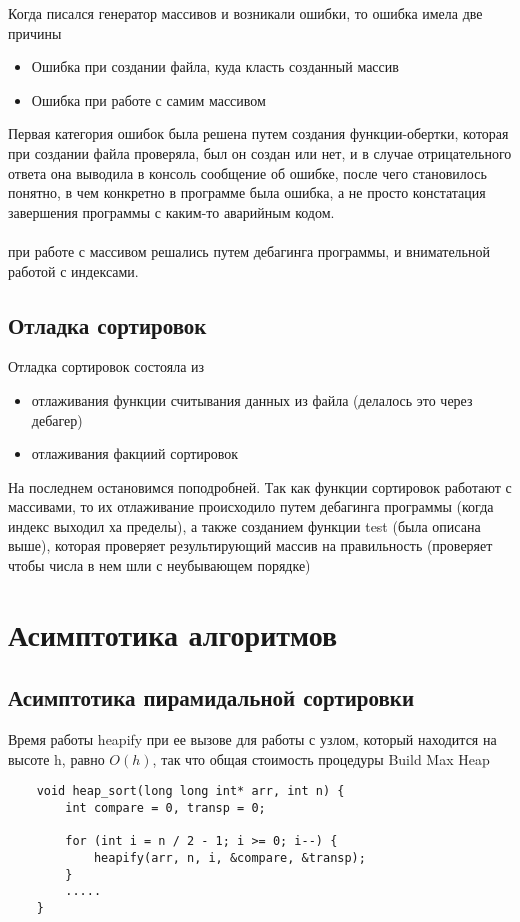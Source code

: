 \documentclass[a4paper,12pt,titlepage,finall]{article}
\begin{document}
Когда писался генератор массивов и возникали ошибки, то ошибка имела две причины
\begin{itemize}
    \item Ошибка при создании файла, куда класть созданный массив
    \item Ошибка при работе с самим массивом
\end{itemize}

Первая категория ошибок была решена путем создания функции-обертки, которая
при создании файла проверяла, был он создан или нет, и в случае отрицательного ответа она
выводила в консоль сообщение об ошибке, после чего становилось понятно, в чем конкретно 
в программе была ошибка, а не просто констатация завершения программы с каким-то аварийным кодом.
\\
\\
 при работе с массивом решались путем дебагинга программы,
и внимательной работой с индексами.

\subsection{Отладка сортировок}

Отладка сортировок состояла из 
\begin{itemize}
    \item отлаживания функции считывания данных из файла (делалось это через дебагер)
    \item отлаживания факциий сортировок
\end{itemize}

На последнем остановимся поподробней. Так как функции сортировок работают с массивами, то
их отлаживание происходило путем дебагинга программы (когда индекс выходил ха пределы),
а также созданием функции test (была описана выше), которая проверяет результирующий массив на 
правильность (проверяет чтобы числа в нем шли с неубывающем порядке)


\newpage

\section{Асимптотика алгоритмов}

\subsection{Асимптотика пирамидальной сортировки}

Время работы heapify при ее вызове для работы с узлом, который находится на высоте h,
равно $O(h)$, так что общая стоимость процедуры Build Max Heap
\begin{verbatim}
    void heap_sort(long long int* arr, int n) {
        int compare = 0, transp = 0;
    
        for (int i = n / 2 - 1; i >= 0; i--) {
            heapify(arr, n, i, &compare, &transp);
        }
        .....
    }
\end{verbatim}
\end{document}
